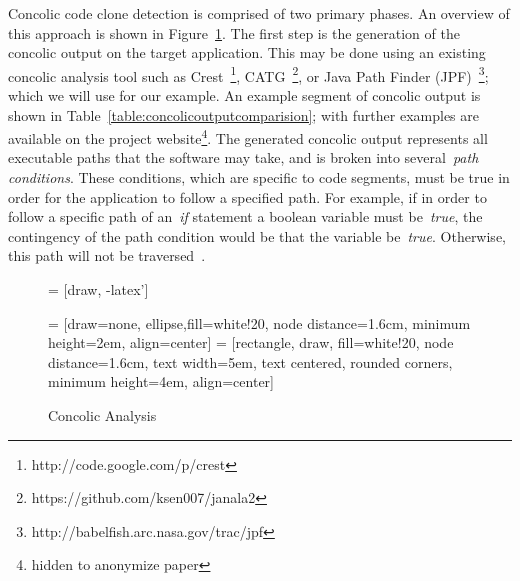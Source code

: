 \documentclass{sig-alternate}
\newif\ifisnopii
\begin{document}
Concolic code clone detection is comprised of two primary phases. An overview of this approach is shown in Figure~\ref{fig:comprocess}. The first step is the generation of the concolic output on the target application. This may be done using an existing concolic analysis tool such as Crest~\footnote{http://code.google.com/p/crest}, CATG~\footnote{https://github.com/ksen007/janala2}, or Java Path Finder (JPF)~\footnote{http://babelfish.arc.nasa.gov/trac/jpf}; which we will use for our example. An example segment of concolic output is shown in Table~\ref{table:concolicoutputcomparision}; with further examples are available on the project website\footnote{\ifisnopii\url{http://www.se.rit.edu/~dkrutz/CCCD/}\else  hidden to anonymize paper\fi}. The generated concolic output represents all executable paths that the software may take, and is broken into several~\emph{path conditions}. These conditions, which are specific to code segments, must be true in order for the application to follow a specified path. For example, if in order to follow a specific path of an~\emph{if} statement a boolean variable must be~\emph{true}, the contingency of the path condition would be that the variable be~\emph{true}. Otherwise, this path will not be traversed~\cite{Sen:2005:CCU:1081706.1081750}.


\begin{figure}[h] %

\begin{center}
 = [draw, -latex']

 = [draw=none, ellipse,fill=white!20, node distance=1.6cm, minimum height=2em, align=center]
 = [rectangle, draw, fill=white!20, node distance=1.6cm, text width=5em, text centered, rounded corners, minimum height=4em, align=center]
\caption{Concolic Analysis}
\label{fig:comprocess}
\end{center}
\end{figure}
\end{document}
